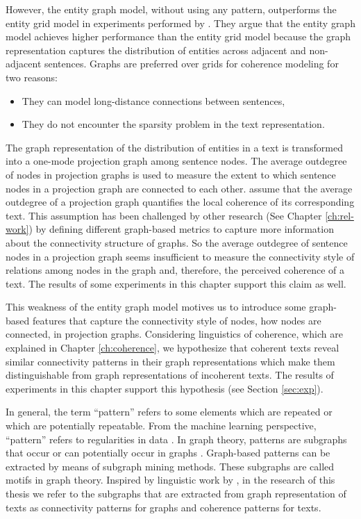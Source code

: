 However, the entity graph model, without using any pattern, outperforms the entity grid model in experiments performed by . 
They argue that the entity graph model achieves higher performance than the entity grid model because the graph representation captures the distribution of entities across adjacent and non-adjacent sentences. 
Graphs are preferred over grids for coherence modeling for two reasons:

\begin{itemize}

	\item They can model long-distance connections between sentences,

	\item They do not encounter the sparsity problem in the text representation. 

\end{itemize}

The graph representation of the distribution of entities in a text is transformed into a \mbox{one-mode} projection graph among sentence nodes. 
The average outdegree of nodes in projection graphs is used to measure the extent to which sentence nodes in a projection graph are connected to each other. 
 assume that the average outdegree of a projection graph quantifies the local coherence of its corresponding text. 
This assumption has been challenged by other research (See Chapter \ref{ch:rel-work}) by defining different graph-based metrics to capture more information about the connectivity structure of graphs. 
So the average outdegree of sentence nodes in a projection graph seems insufficient to measure the connectivity style of relations among nodes in the graph and, therefore, the perceived coherence of a text. 
The results of some experiments in this chapter support this claim as well. 

This weakness of the entity graph model motives us to introduce some graph-based features that capture the connectivity style of nodes, how nodes are connected, in projection graphs. 
Considering linguistics of coherence, which are explained in Chapter \ref{ch:coherence}, we hypothesize that  coherent texts reveal similar connectivity patterns in their graph representations which make them distinguishable from graph representations of incoherent texts. 
The results of experiments in this chapter support this hypothesis (see Section \ref{sec:exp}). 

In general, the term ``pattern'' refers to some elements which are repeated or which are potentially repeatable. 
From the machine learning perspective, ``pattern'' refers to regularities in data \cite{bishop06}.     
In graph theory, patterns are subgraphs that occur or can potentially occur in graphs \cite{newmanmark10}. 
Graph-based patterns can be extracted by means of subgraph mining methods. 
These subgraphs are called motifs in graph theory. 
Inspired by linguistic work by , in the research of this thesis we refer to the  subgraphs that are extracted from graph representation of texts as connectivity patterns for graphs and coherence patterns for texts.  


